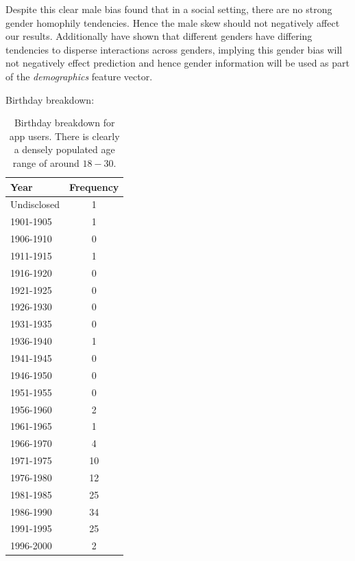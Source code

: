 Despite this clear male bias \cite{jugand} found that in a social setting, there are no strong gender homophily tendencies. Hence the male 
skew should not negatively affect our results. Additionally \cite{backstrom2011center} have shown that different genders have differing 
tendencies to disperse interactions across genders, implying this gender bias will not negatively effect prediction and hence gender information will be used as 
part of the \emph{demographics} feature vector.

\clearpage

Birthday breakdown:

\begin{table}[!htbp]
\centering
	\begin{tabular}{|l|c|} %
		\hline
		\textbf{Year} & \textbf{Frequency}  \\ \hline
		Undisclosed & 1 \\ \hline
		1901-1905 & 1 \\ \hline
		1906-1910 & 0 \\ \hline
		1911-1915 & 1 \\ \hline
		1916-1920 & 0 \\ \hline
		1921-1925 & 0 \\ \hline
		1926-1930 & 0 \\ \hline
		1931-1935 & 0 \\ \hline
		1936-1940 & 1 \\ \hline
		1941-1945 & 0 \\ \hline
		1946-1950 & 0 \\ \hline
		1951-1955 & 0 \\ \hline
		1956-1960 & 2 \\ \hline
		1961-1965 & 1 \\ \hline
		1966-1970 & 4 \\ \hline
		1971-1975 & 10 \\ \hline
		1976-1980 & 12 \\ \hline
		1981-1985 & 25 \\ \hline
		1986-1990 & 34 \\ \hline
		1991-1995 & 25 \\ \hline
		1996-2000 & 2 \\ \hline
	\end{tabular}
	\caption{Birthday breakdown for app users. There is clearly a densely populated age range of around $18 - 30$.}
	\label{tab:revpol}
\end{table}


